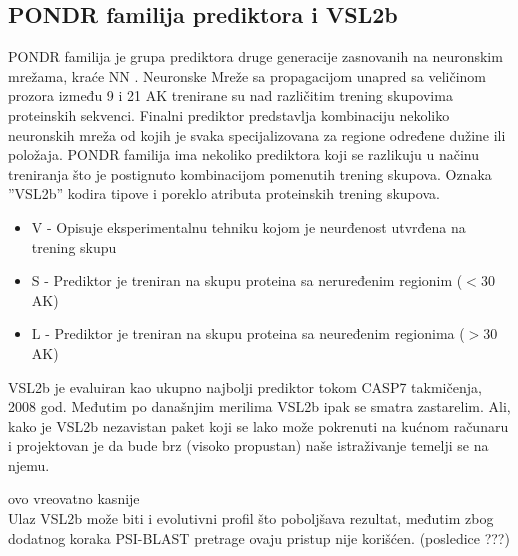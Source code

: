 \subsection{PONDR familija prediktora i VSL2b}

PONDR familija  je grupa
prediktora druge generacije zasnovanih na neuronskim mrežama, kraće NN .
Neuronske Mreže sa propagacijom unapred  sa veličinom
prozora između 9 i 21 AK trenirane su nad različitim trening skupovima
proteinskih sekvenci.  Finalni prediktor predstavlja kombinaciju nekoliko
neuronskih mreža od kojih je svaka specijalizovana za regione određene dužine
ili položaja.  PONDR familija ima nekoliko prediktora koji  se razlikuju u
načinu treniranja što je postignuto kombinacijom pomenutih trening skupova.
Oznaka ''VSL2b'' kodira tipove i poreklo atributa proteinskih trening skupova.
\begin{itemize}
  \item V - Opisuje eksperimentalnu tehniku kojom je neurđenost utvrđena na
    trening skupu 
  \item S - Prediktor je treniran na skupu proteina sa 
      neruređenim regionim ($<30$ AK)
  \item L - Prediktor je treniran na skupu proteina sa 
    neuređenim regionima ($>30$ AK)
\end{itemize}

VSL2b je evaluiran kao ukupno najbolji prediktor tokom CASP7
takmičenja\parencite{bohe2009},  2008 god. Međutim po današnjim merilima
\parencite{meng2017} VSL2b ipak se smatra zastarelim. 
Ali, kako je VSL2b nezavistan paket koji se lako može pokrenuti na kućnom računaru
i projektovan je da bude brz (visoko propustan) naše istraživanje temelji se
na njemu.

ovo vreovatno kasnije\\
Ulaz VSL2b može biti i evolutivni profil što poboljšava rezultat,  međutim zbog
dodatnog koraka PSI-BLAST pretrage ovaju pristup nije korišćen.
(posledice ???)










